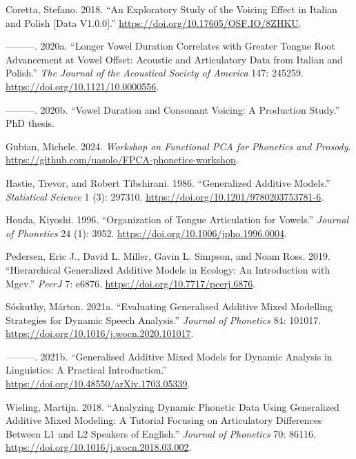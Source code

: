 \documentclass[
]{interact}
\newlength{\cslhangindent}
\newenvironment{CSLReferences}[2] %
 {\begin{list}{}{%
  \setlength{\itemindent}{0pt}
  \setlength{\leftmargin}{0pt}
  \setlength{\parsep}{0pt}
  \ifodd #1
   \setlength{\leftmargin}{\cslhangindent}
   \setlength{\itemindent}{-1\cslhangindent}
  \fi
  \setlength{\itemsep}{#2\baselineskip}}}
 {\end{list}}
\begin{document}
\label{refs}
\begin{CSLReferences}{1}{0}
Coretta, Stefano. 2018. {``An Exploratory Study of the Voicing Effect in
Italian and Polish {[}Data V1.0.0{]}.''}
\url{https://doi.org/10.17605/OSF.IO/8ZHKU}.

---------. 2020a. {``Longer Vowel Duration Correlates with Greater
Tongue Root Advancement at Vowel Offset: Acoustic and Articulatory Data
from Italian and Polish.''} \emph{The Journal of the Acoustical Society
of America} 147: 245259. \url{https://doi.org/10.1121/10.0000556}.

---------. 2020b. {``Vowel Duration and Consonant Voicing: A Production
Study.''} PhD thesis.

Gubian, Michele. 2024. \emph{Workshop on Functional PCA for Phonetics
and Prosody}. \url{https://github.com/uasolo/FPCA-phonetics-workshop}.

Hastie, Trevor, and Robert Tibshirani. 1986. {``Generalized Additive
Models.''} \emph{Statistical Science} 1 (3): 297310.
\url{https://doi.org/10.1201/9780203753781-6}.

Honda, Kiyoshi. 1996. {``Organization of Tongue Articulation for
Vowels.''} \emph{Journal of Phonetics} 24 (1): 3952.
\url{https://doi.org/10.1006/jpho.1996.0004}.

Pedersen, Eric J., David L. Miller, Gavin L. Simpson, and Noam Ross.
2019. {``Hierarchical Generalized Additive Models in Ecology: An
Introduction with Mgcv.''} \emph{PeerJ} 7: e6876.
\url{https://doi.org/10.7717/peerj.6876}.

Sóskuthy, Márton. 2021a. {``Evaluating Generalised Additive Mixed
Modelling Strategies for Dynamic Speech Analysis.''} \emph{Journal of
Phonetics} 84: 101017. \url{https://doi.org/10.1016/j.wocn.2020.101017}.

---------. 2021b. {``Generalised Additive Mixed Models for Dynamic
Analysis in Linguistics: A Practical Introduction.''}
\url{https://doi.org/10.48550/arXiv.1703.05339}.

Wieling, Martijn. 2018. {``Analyzing Dynamic Phonetic Data Using
Generalized Additive Mixed Modeling: A Tutorial Focusing on Articulatory
Differences Between L1 and L2 Speakers of English.''} \emph{Journal of
Phonetics} 70: 86116. \url{https://doi.org/10.1016/j.wocn.2018.03.002}.


\end{CSLReferences}
\end{document}

